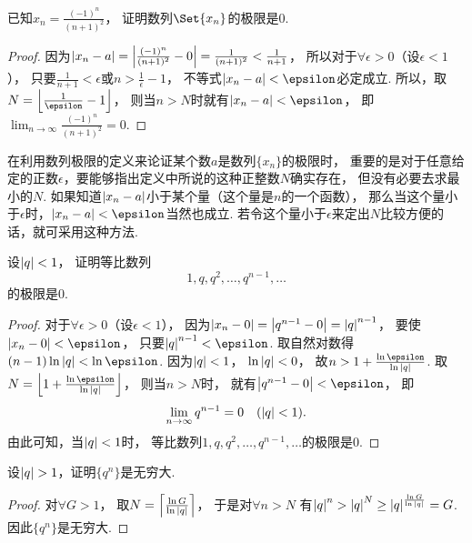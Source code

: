 \begin{example}
已知\(x_n = \frac{(-1)^n}{(n+1)^2}\)，
证明数列\(\Set{x_n}\)的极限是\(0\).
\begin{proof}
因为\(\abs{x_n - a}
= \abs{\frac{(-1)^n}{(n+1)^2}-0}
= \frac{1}{(n+1)^2}
< \frac{1}{n+1}\)，
所以对于\(\forall\epsilon>0\)（设\(\epsilon<1\)），
只要\(\frac{1}{n+1}<\epsilon\)或\(n>\frac{1}{\epsilon}-1\)，
不等式\(\abs{x_n-a}<\epsilon\)必定成立.
所以，取\(N=\floor*{\frac{1}{\epsilon}-1}\)，
则当\(n>N\)时就有\(\abs{x_n - a}<\epsilon\)，
即\(\lim_{n\to\infty}\frac{(-1)^n}{(n+1)^2}=0\).
\end{proof}
\end{example}

在利用数列极限的定义来论证某个数\(a\)是数列\(\{x_n\}\)的极限时，
重要的是对于任意给定的正数\(\epsilon\)，要能够指出定义中所说的这种正整数\(N\)确实存在，
但没有必要去求最小的\(N\).
如果知道\(\abs{x_n-a}\)小于某个量（这个量是\(n\)的一个函数），
那么当这个量小于\(\epsilon\)时，\(\abs{x_n-a}<\epsilon\)当然也成立.
若令这个量小于\(\epsilon\)来定出\(N\)比较方便的话，就可采用这种方法.

\begin{example}
设\(\abs{q}<1\)，
证明等比数列\begin{equation*}
	1,q,q^2,\dotsc,q^{n-1},\dotsc
\end{equation*}的极限是\(0\).
\begin{proof}
对于\(\forall\epsilon>0\)（设\(\epsilon<1\)），
因为\(\abs{x_n-0}=\abs{q^{n-1}-0}=\abs{q}^{n-1}\)，
要使\(\abs{x_n-0}<\epsilon\)，
只要\(\abs{q}^{n-1}<\epsilon\).
取自然对数得\((n-1)\ln\abs{q}<\ln\epsilon\).
因为\(\abs{q}<1\)，
\(\ln\abs{q}<0\)，
故\(n>1+\frac{\ln\epsilon}{\ln\abs{q}}\).
取\(N=\floor*{1+\frac{\ln\epsilon}{\ln\abs{q}}}\)，
则当\(n>N\)时，
就有\(\abs{q^{n-1}-0}<\epsilon\)，
即
\begin{equation}\label{equation:数列极限.重要极限1}
	\lim_{n\to\infty}q^{n-1}=0
	\quad(\abs{q}<1).
\end{equation}
由此可知，当\(\abs{q}<1\)时，
等比数列\(1,q,q^2,\dotsc,q^{n-1},\dotsc\)的极限是\(0\).
\end{proof}
\end{example}

\begin{example}
设\(\abs{q}>1\)，证明\(\{q^n\}\)是无穷大.
\begin{proof}
对\(\forall G>1\)，
取\(N=\ceil*{\frac{\ln G}{\ln\abs{q}}}\)，
于是对\(\forall n>N\)
有\(\abs{q}^n > \abs{q}^N \geq \abs{q}^{\frac{\ln G}{\ln\abs{q}}} = G\).
因此\(\{q^n\}\)是无穷大.
\end{proof}
\end{example}

